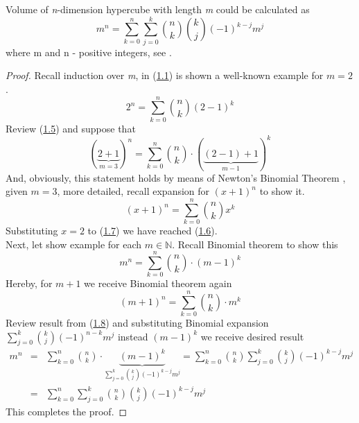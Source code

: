 \begin{thm}
    Volume of \textit{n}-dimension hypercube with length \textit{m} could be calculated as
    \begin{equation}
        \label{hyp3}
        m^n=\sum_{k=0}^{n}\sum_{j=0}^{k}\binom{n}{k}\binom{k}{j}(-1)^{k-j}m^j
    \end{equation}
    where m and n - positive integers, see \cite{10}.
    \begin{proof}
        Recall induction over \textit{m}, in (\hyperref[hyp1]{1.1}) is shown a well-known example for $m=2$.
        \begin{equation}
            \label{d1}
            2^n=\sum_{k=0}^{n}\binom{n}{k}(2-1)^k
        \end{equation}
        Review (\hyperref[d1]{1.5}) and suppose that
        \begin{equation}
            \label{hyp4}
            (\underbrace{2+1}_{m=3})^n=\sum_{k=0}^{n}\binom{n}{k}\cdot (\underbrace{(2-1)+1}_{m-1})^k
        \end{equation}
        And, obviously, this statement holds by means of Newton's Binomial Theorem \cite{2}, \cite{4} given $m=3$, more detailed, recall expansion for $(x+1)^n$ to show it.
        \begin{equation}
            \label{d2}
            (x+1)^n=\sum_{k=0}^{n}\binom{n}{k}x^k
        \end{equation}
        Substituting $x=2$ to (\hyperref[d2]{1.7}) we have reached (\hyperref[hyp4]{1.6}).\\
        Next, let show example for each $m\in\mathbb{N}$. Recall Binomial theorem to show this
        \begin{equation}
            \label{hyp5}
            m^n=\sum_{k=0}^{n}\binom{n}{k}\cdot (m-1)^k
        \end{equation}
        Hereby, for $m+1$ we receive Binomial theorem again
        \begin{equation}
            \label{hyp6}
            (m+1)^n=\sum_{k=0}^{n}\binom{n}{k}\cdot m^k
        \end{equation}
        Review result from (\hyperref[hyp5]{1.8}) and substituting Binomial expansion $\sum_{j=0}^{k}\binom{k}{j}(-1)^{n-k}m^j$ instead $(m-1)^k$ we receive desired result
        \begin{eqnarray}
            \label{hyp8}
            m^n &=& \sum_{k=0}^{n}\binom{n}{k}\cdot \underbrace{(m-1)^k}_{\sum_{j=0}^{k}\binom{k}{j}(-1)^{k-j}m^j}=\sum_{k=0}^{n}\binom{n}{k}\sum_{j=0}^{k}\binom{k}{j}(-1)^{k-j}m^j\\
            &=& \sum_{k=0}^{n}\sum_{j=0}^{k}\binom{n}{k}\binom{k}{j}(-1)^{k-j}m^j \nonumber
        \end{eqnarray}
        This completes the proof.
    \end{proof}
\end{thm}
